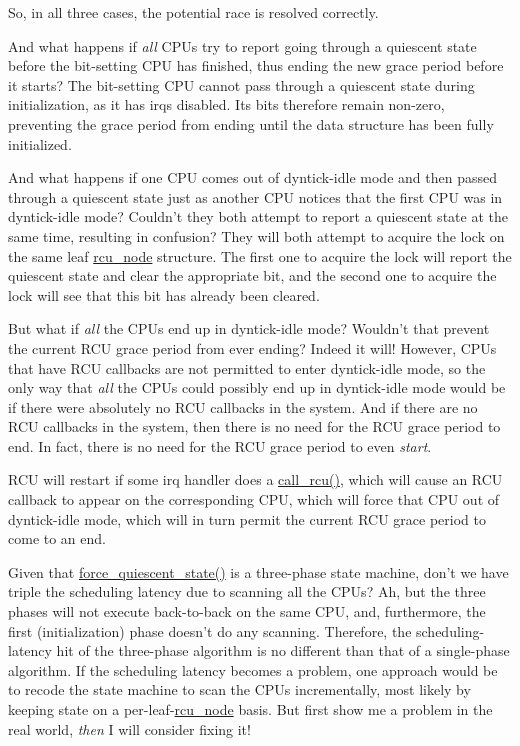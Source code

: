 	So, in all three cases, the potential race is resolved correctly.

\QuickQ{}
	And what happens if \emph{all} CPUs try to report going
	through a quiescent
	state before the bit-setting CPU has finished, thus ending the new
	grace period before it starts?
\QuickA{}
	The bit-setting CPU cannot pass through a
	quiescent state during initialization, as it has irqs disabled.
	Its bits therefore remain non-zero, preventing the grace period from
	ending until the data structure has been fully initialized.

\QuickQ{}
	And what happens if one CPU comes out of dyntick-idle mode and then
	passed through a quiescent state just as another CPU notices that the
	first CPU was in dyntick-idle mode?
	Couldn't they both attempt to report a quiescent state at the same
	time, resulting in confusion?
\QuickA{}
	They will both attempt to acquire the lock on the same leaf
	\url{rcu_node} structure.
	The first one to acquire the lock will report the quiescent state
	and clear the appropriate bit, and the second one to acquire the
	lock will see that this bit has already been cleared.

\QuickQ{}
	But what if \emph{all} the CPUs end up in dyntick-idle mode?
	Wouldn't that prevent the current RCU grace period from ever ending?
\QuickA{}
	Indeed it will!
	However, CPUs that have RCU callbacks are not permitted to enter
	dyntick-idle mode, so the only way that \emph{all} the CPUs could
	possibly end up in dyntick-idle mode would be if there were
	absolutely no RCU callbacks in the system.
	And if there are no RCU callbacks in the system, then there is no
	need for the RCU grace period to end.
	In fact, there is no need for the RCU grace period to even
	\emph{start}.

	RCU will restart if some irq handler does a \url{call_rcu()},
	which will cause an RCU callback to appear on the corresponding CPU,
	which will force that CPU out of dyntick-idle mode, which will in turn
	permit the current RCU grace period to come to an end.

\QuickQ{}
	Given that \url{force_quiescent_state()} is a three-phase state
	machine, don't we have triple the scheduling latency due to scanning
	all the CPUs?
\QuickA{}
	Ah, but the three phases will not execute back-to-back on the same CPU,
	and, furthermore, the first (initialization) phase doesn't do any
	scanning.
	Therefore, the scheduling-latency hit of the three-phase algorithm
	is no different than that of a single-phase algorithm.
	If the scheduling latency becomes a problem, one approach would be to
	recode the state machine to scan the CPUs incrementally, most likely
	by keeping state on a per-leaf-\url{rcu_node} basis.
	But first show me a problem in the real world, \emph{then}
	I will consider fixing it!

